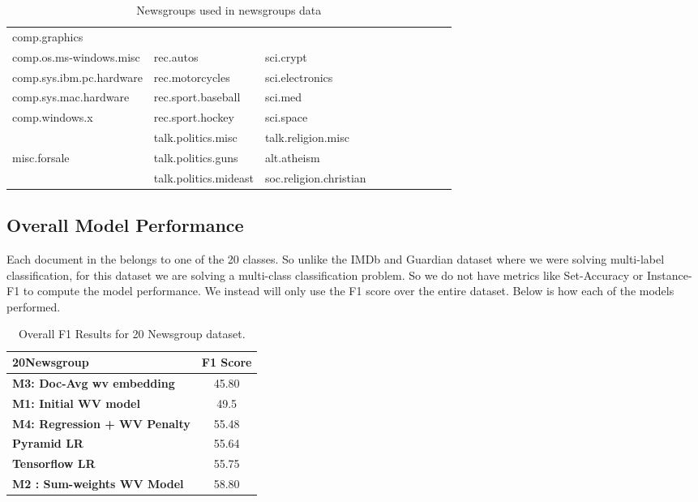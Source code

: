\begin{table}[htbp]
\begin{tabular}{|l|l|l|lllllll}
\cline{1-3}
comp.graphics            &                       &                        &  &  &  &  &  &  &  \\
comp.os.ms-windows.misc  & rec.autos             & sci.crypt              &  &  &  &  &  &  &  \\
comp.sys.ibm.pc.hardware & rec.motorcycles       & sci.electronics        &  &  &  &  &  &  &  \\
comp.sys.mac.hardware    & rec.sport.baseball    & sci.med                &  &  &  &  &  &  &  \\
comp.windows.x           & rec.sport.hockey      & sci.space              &  &  &  &  &  &  &  \\ \cline{1-3}
                         & talk.politics.misc    & talk.religion.misc     &  &  &  &  &  &  &  \\
misc.forsale             & talk.politics.guns    & alt.atheism            &  &  &  &  &  &  &  \\
                         & talk.politics.mideast & soc.religion.christian &  &  &  &  &  &  &  \\ \cline{1-3}
\end{tabular}
\caption{\label{tab:widgets}Newsgroups used in newsgroups data}
\end{table}

\subsection{Overall Model Performance}

Each document in the belongs to one of the 20 classes. So unlike the IMDb and Guardian dataset where we were solving multi-label classification, for this dataset we are solving a multi-class classification problem. So we do not have metrics like Set-Accuracy or Instance-F1 to compute the model performance. We instead will only use the F1 score over the entire dataset. Below is how each of the models performed.

\begin{table}[htbp]
\centering
\begin{tabular}{l|c}
20Newsgroup & \textbf{F1 Score} \\ \hline
\textbf{M3: Doc-Avg wv embedding} & 45.80 \\
\textbf{M1: Initial WV model} & 49.5 \\
\textbf{M4: Regression + WV Penalty} & 55.48 \\
\textbf{Pyramid LR} & 55.64 \\
\textbf{Tensorflow LR} & 55.75 \\
\textbf{M2 : Sum-weights WV Model} & 58.80
\end{tabular}
\caption{\label{tab:widgets}Overall F1 Results for 20 Newsgroup dataset.}
\end{table}

